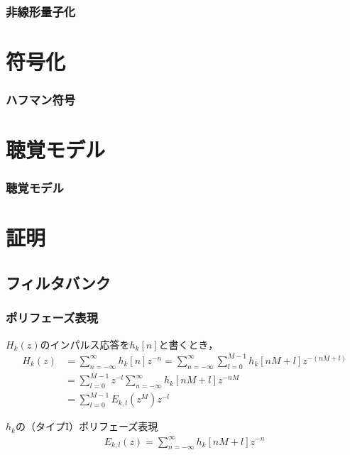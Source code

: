 \documentclass[14pt,xcolor=dvipsnames,table,dvipdfmx]{beamer}
\begin{document}
\begin{frame}[c]
    \frametitle{非線形量子化}
\end{frame}

\section{符号化}

\begin{frame}[c]
    \frametitle{ハフマン符号}
\end{frame}

\section{聴覚モデル}

\begin{frame}[c]
    \frametitle{聴覚モデル}
\end{frame}

\appendix

\section{証明}

\subsection{フィルタバンク} \label{sec:proofs_filter_bank}

\begin{frame}[c]
    \frametitle{ポリフェーズ表現}
    $H_{k}(z)$のインパルス応答を$h_{k}[n]$と書くとき，
    \small
    \begin{align*}
        H_{k}(z) &= \sum_{n = -\infty}^{\infty} h_{k}[n] z^{-n} = \sum_{n = -\infty}^{\infty} \sum_{l = 0}^{M - 1} h_{k}[nM + l] z^{-(nM+l)} \\
        &= \sum_{l = 0}^{M - 1} z^{-l} \sum_{n = -\infty}^{\infty}h_{k}[nM + l] z^{-nM} \\
        &= \sum_{l = 0}^{M - 1} E_{k,l}(z^{M}) z^{-l}
    \end{align*}
    \normalsize
    \begin{block}{$h_{k}$の（タイプI）ポリフェーズ表現}
        \vspace{-13pt}
        \begin{align}
            E_{k,l}(z) = \sum_{n = -\infty}^{\infty} h_{k}[nM + l] z^{-n} \label{eq:type1_polyphase_representation}
        \end{align}
    \end{block}
\end{frame}
\end{document}
